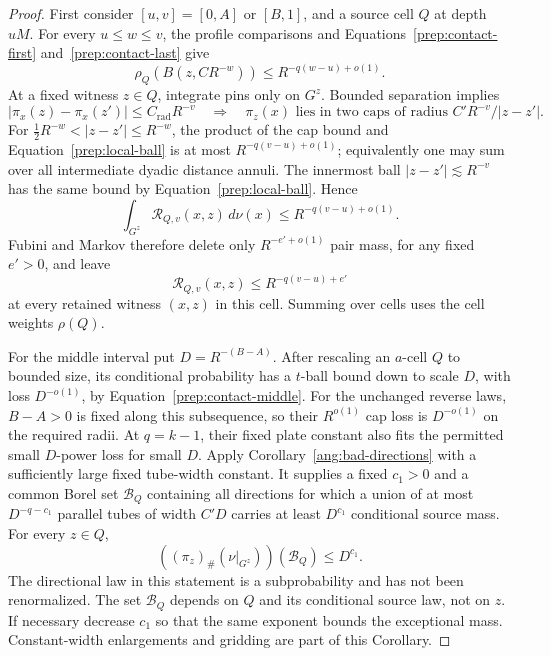 \begin{proof}
First consider $[u,v]=[0,A]$ or $[B,1]$, and a source cell $Q$ at
depth $uM$.
For every $u\le w\le v$, the profile comparisons and
Equations~\eqref{prep:contact-first} and~\eqref{prep:contact-last} give
\begin{equation}\label{prep:local-ball}
 \rho_Q(B(z,CR^{-w}))\le R^{-q(w-u)+o(1)}.
\end{equation}
At a fixed witness $z\in Q$, integrate pins only on $G^z$.
Bounded separation implies
\[
 |\pi_x(z)-\pi_x(z')|\le C_{\mathrm{rad}}R^{-v}
 \quad\Longrightarrow\quad
 \pi_z(x)\text{ lies in two caps of radius }
 C'R^{-v}/|z-z'|.
\]
For $\tfrac12R^{-w}<|z-z'|\le R^{-w}$, the product of the cap bound
and Equation~\eqref{prep:local-ball} is at most
$R^{-q(v-u)+o(1)}$; equivalently one may sum over all intermediate
dyadic distance annuli. The innermost ball $|z-z'|\lesssim R^{-v}$
has the same bound by Equation~\eqref{prep:local-ball}. Hence
\begin{equation}\label{prep:local-mean}
 \int_{G^z}\mathcal R_{Q,v}(x,z)\,d\nu(x)
 \le R^{-q(v-u)+o(1)}.
\end{equation}
Fubini and Markov therefore delete only $R^{-e'+o(1)}$ pair mass,
for any fixed $e'>0$, and leave
\[
 \mathcal R_{Q,v}(x,z)\le R^{-q(v-u)+e'}
\]
at every retained witness $(x,z)$ in this cell. Summing over cells
uses the cell weights $\rho(Q)$.

For the middle interval put $D=R^{-(B-A)}$. After rescaling an
$a$-cell $Q$ to bounded size, its conditional probability has a
$t$-ball bound down to scale $D$, with loss $D^{-o(1)}$, by
Equation~\eqref{prep:contact-middle}. For the unchanged reverse laws,
$B-A>0$ is fixed along this subsequence, so their $R^{o(1)}$ cap loss
is $D^{-o(1)}$ on the required radii. At $q=k-1$, their fixed plate
constant also fits the permitted small $D$-power loss for small $D$.
Apply Corollary~\ref{ang:bad-directions} with a sufficiently large fixed
tube-width constant. It supplies a fixed $c_1>0$ and a common Borel
set $\mathcal B_Q$ containing all directions for which a union of
at most $D^{-q-c_1}$ parallel tubes of width $C'D$ carries at least
$D^{c_1}$ conditional source mass. For every $z\in Q$,
\begin{equation}\label{prep:witness-bad}
 ((\pi_z)_\#(\nu|_{G^z}))(\mathcal B_Q)\le D^{c_1}.
\end{equation}
The directional law in this statement is a subprobability and has not
been renormalized. The set $\mathcal B_Q$ depends on $Q$ and its
conditional source law, not on $z$. If necessary decrease $c_1$ so
that the same exponent bounds the exceptional mass. Constant-width
enlargements and gridding are part of this Corollary.


\end{proof}
